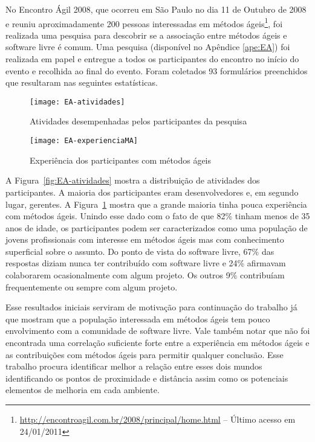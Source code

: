 No Encontro Ágil 2008, que ocorreu em São Paulo no dia 11 de Outubro
de 2008 e reuniu aproximadamente 200 pessoas interessadas em métodos
ágeis\footnote{\url{http://encontroagil.com.br/2008/principal/home.html}
  -- Último acesso em 24/01/2011}, foi realizada uma pesquisa para
descobrir se a associação entre métodos ágeis e software livre é
comum. Uma pesquisa (disponível no Apêndice \ref{ape:EA}) foi
realizada em papel e entregue a todos os participantes do encontro no
início do evento e recolhida ao final do evento. Foram coletados 93
formulários preenchidos que resultaram nas seguintes estatísticas.


\begin{figure}[htb]
  \begin{minipage}[t]{0.5\linewidth}
    \centering
    \texttt{[image: EA-atividades]}
    \caption{Atividades desempenhadas pelos participantes da pesquisa}
    \label{fig:EA-atividades}
  \end{minipage}
  \begin{minipage}[t]{0.5\linewidth}
    \centering
    \texttt{[image: EA-experienciaMA]}
    \caption{Experiência dos participantes com métodos ágeis}
    \label{fig:EA-experienciaMA}
  \end{minipage}
\end{figure}

A Figura~\ref{fig:EA-atividades} mostra a distribuição de atividades
dos participantes. A maioria dos participantes eram desenvolvedores e,
em segundo lugar, gerentes. A Figura~\ref{fig:EA-experienciaMA} mostra
que a grande maioria tinha pouca experiência com métodos ágeis. Unindo
esse dado com o fato de que 82\% tinham menos de 35 anos de idade, os
participantes podem ser caracterizados como uma população de jovens
profissionais com interesse em métodos ágeis mas com conhecimento
superficial sobre o assunto. Do ponto de vista do software livre, 67\%
das respostas diziam nunca ter contribuído com software livre e 24\%
afirmavam colaborarem ocasionalmente com algum projeto. Os outros 9\%
contribuíam frequentemente ou sempre com algum projeto.


Esse resultados iniciais serviram de motivação para continuação do
trabalho já que mostram que a população interessada em métodos ágeis
tem pouco envolvimento com a comunidade de software livre. Vale também
notar que não foi encontrada uma correlação suficiente forte entre a
experiência em métodos ágeis e as contribuições com métodos ágeis para
permitir qualquer conclusão. Esse trabalho procura identificar melhor
a relação entre esses dois mundos identificando os pontos de
proximidade e distância assim como os potenciais elementos de melhoria
em cada ambiente.

